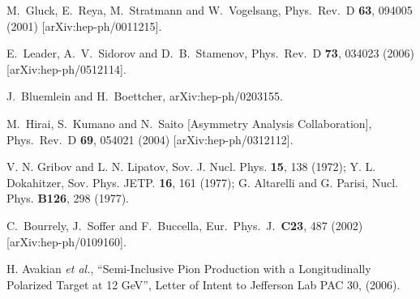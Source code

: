 \documentclass[12pt]{article}
\begin{document}
\begin{thebibliography}{99}
  M.~Gluck, E.~Reya, M.~Stratmann and W.~Vogelsang,
  Phys.\ Rev.\ D {\bf 63}, 094005 (2001)
  [arXiv:hep-ph/0011215].

  E.~Leader, A.~V.~Sidorov and D.~B.~Stamenov,
  Phys.\ Rev.\ D {\bf 73}, 034023 (2006)
  [arXiv:hep-ph/0512114].

 J.~Bluemlein and H.~Boettcher, arXiv:hep-ph/0203155.

  M.~Hirai, S.~Kumano and N.~Saito  [Asymmetry Analysis Collaboration],
  Phys.\ Rev.\ D {\bf 69}, 054021 (2004)
  [arXiv:hep-ph/0312112].
%

 V. N. Gribov and L. N. Lipatov, Sov. J. Nucl. Phys. {\bf 15},
138 (1972); Y. L. Dokahitzer, Sov. Phys. JETP. {\bf 16}, 161 (1977); G.
Altarelli and G. Parisi, Nucl. Phys.  {\bf B126}, 298 (1977).
%

  
  C.~Bourrely, J.~Soffer and F.~Buccella,
  Eur.\ Phys.\ J.\  {\bf C23}, 487 (2002)
  [arXiv:hep-ph/0109160].
%


  


 H. Avakian {\it et al.}, ``Semi-Inclusive Pion Production with a Longitudinally
Polarized Target at 12 GeV'',
Letter of Intent to Jefferson Lab PAC 30, (2006).


\end{thebibliography}
\end{document}
